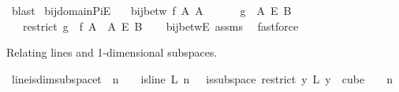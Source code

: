 \begin{isabellebody}
\ blast\isanewline
{}\isamarkupfalse%
%
\endisatagproof
{\isafoldproof}%
%
\isadelimproof
\isanewline
%
\endisadelimproof
\isanewline
{}\isamarkupfalse%
\ bij{\isacharunderscore}{\kern0pt}domain{\isacharunderscore}{\kern0pt}PiE{\isacharcolon}{\kern0pt}\isanewline
\ \ \ {\isachardoublequoteopen}bij{\isacharunderscore}{\kern0pt}betw\ f\ A{}\ A{}{\isachardoublequoteclose}\ \isanewline
\ \ \ \ \ {\isachardoublequoteopen}g\ {\isasymin}\ A{}\ {\isasymrightarrow}\isactrlsub E\ B{\isachardoublequoteclose}\isanewline
\ \ \ {\isachardoublequoteopen}{\isacharparenleft}{\kern0pt}restrict\ {\isacharparenleft}{\kern0pt}g\ {\isasymcirc}\ f{\isacharparenright}{\kern0pt}\ A{}{\isacharparenright}{\kern0pt}\ {\isasymin}\ A{}\ {\isasymrightarrow}\isactrlsub E\ B{\isachardoublequoteclose}\isanewline
%
\isadelimproof
\ \ %
\endisadelimproof
%
\isatagproof
{}\isamarkupfalse%
\ bij{\isacharunderscore}{\kern0pt}betwE\ assms\ \isamarkupfalse%
\ fastforce%
\endisatagproof
{\isafoldproof}%
%
\isadelimproof
%
\endisadelimproof
%
\begin{isamarkuptext}%
Relating lines and 1-dimensional subspaces.%
\end{isamarkuptext}\isamarkuptrue%
\isamarkupfalse%
\ line{\isacharunderscore}{\kern0pt}is{\isacharunderscore}{\kern0pt}dim{}{\isacharunderscore}{\kern0pt}subspace{\isacharunderscore}{\kern0pt}t{\isacharunderscore}{\kern0pt}{}{\isacharcolon}{\kern0pt}\ \ {\isachardoublequoteopen}n\ {\isachargreater}{\kern0pt}\ {}{\isachardoublequoteclose}\ \ {\isachardoublequoteopen}is{\isacharunderscore}{\kern0pt}line\ L\ n\ {}{\isachardoublequoteclose}\ \ {\isachardoublequoteopen}is{\isacharunderscore}{\kern0pt}subspace\ {\isacharparenleft}{\kern0pt}restrict\ {\isacharparenleft}{\kern0pt}{\isasymlambda}y{\isachardot}{\kern0pt}\ L\ {\isacharparenleft}{\kern0pt}y\ {}{\isacharparenright}{\kern0pt}{\isacharparenright}{\kern0pt}\ {\isacharparenleft}{\kern0pt}cube\ {}\ {}{\isacharparenright}{\kern0pt}{\isacharparenright}{\kern0pt}\ {}\ n\ {}{\isachardoublequoteclose}\isanewline
%
\isadelimproof
%
\endisadelimproof
%
\isatagproof
{}\isamarkupfalse%
\ {\isacharminus}{\kern0pt}\isanewline
\ \ \isamarkupfalse%

\end{isabellebody}
